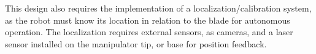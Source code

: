 

This design also requires the implementation of a localization/calibration
system, as the robot must know its location in relation to the blade for
autonomous operation. The localization requires external sensors, as cameras,
and a laser sensor installed on the manipulator tip, or base for position
feedback.




